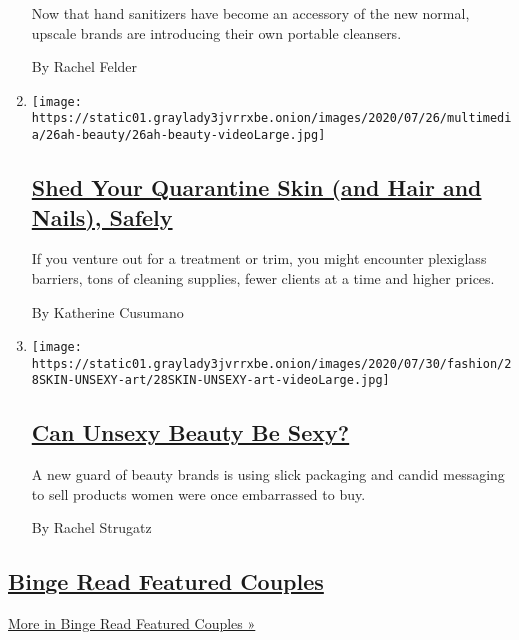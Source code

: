 \begin{enumerate}
  Now that hand sanitizers have become an accessory of the new normal,
  upscale brands are introducing their own portable cleansers.

  By Rachel Felder
\item
  \texttt{[image: https://static01.graylady3jvrrxbe.onion/images/2020/07/26/multimedia/26ah-beauty/26ah-beauty-videoLarge.jpg]}

  \hypertarget{shed-your-quarantine-skin-and-hair-and-nails-safely}{%
  \subsection{\texorpdfstring{\href{/2020/07/25/at-home/coronavirus-salons.html}{Shed
  Your Quarantine Skin (and Hair and Nails),
  Safely}}{Shed Your Quarantine Skin (and Hair and Nails), Safely}}\label{shed-your-quarantine-skin-and-hair-and-nails-safely}}

  If you venture out for a treatment or trim, you might encounter
  plexiglass barriers, tons of cleaning supplies, fewer clients at a
  time and higher prices.

  By Katherine Cusumano
\item
  \texttt{[image: https://static01.graylady3jvrrxbe.onion/images/2020/07/30/fashion/28SKIN-UNSEXY-art/28SKIN-UNSEXY-art-videoLarge.jpg]}

  \hypertarget{can-unsexy-beauty-be-sexy-1}{%
  \subsection{\texorpdfstring{\href{/2020/07/28/style/can-unsexy-beauty-be-sexy.html}{Can
  Unsexy Beauty Be
  Sexy?}}{Can Unsexy Beauty Be Sexy?}}\label{can-unsexy-beauty-be-sexy-1}}

  A new guard of beauty brands is using slick packaging and candid
  messaging to sell products women were once embarrassed to buy.

  By Rachel Strugatz
\end{enumerate}

\hypertarget{binge-read-featured-couples}{%
\subsection{\texorpdfstring{\href{/spotlight/wedding-announcements}{Binge
Read Featured
Couples}}{Binge Read Featured Couples}}\label{binge-read-featured-couples}}

\href{/spotlight/wedding-announcements}{More in Binge Read Featured
Couples »}

